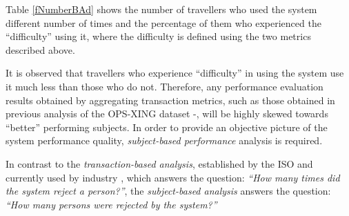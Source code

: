 \documentclass{cta-author}%
\begin{document}
Table \ref{fNumberBAd} shows the  number of travellers who used the system different number of times and the percentage of them who experienced the ``difficulty'' using it, where the difficulty is defined using the two metrics described above.

It is observed that travellers who experience ``difficulty'' in using the system use it much less than those who do not.
Therefore, any performance evaluation results obtained by 
aggregating transaction metrics,
such as those obtained in previous analysis of the OPS-XING dataset \cite{irexVI}-\cite{Bowyer-BTAS2016}, will be highly skewed towards ``better'' performing subjects.
In order to provide an objective picture of the system performance quality, 
\textit{subject-based performance }analysis is required.

In contrast to the \textit{transaction-based analysis},  established by the ISO and currently used by industry \cite{ISO}, which answers the question: 
\textit{``How many times did the system reject a person?''}, 
the \textit{subject-based analysis} answers the question: 
\textit{``How many persons were rejected by the system?'' }
\end{document}
